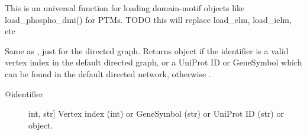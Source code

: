 \documentclass[letterpaper,10pt,english]{sphinxmanual}
\begin{document}
\begin{fulllineitems}

\begin{fulllineitems}
\label{\detokenize{main:pypath.main.PyPath.phosphopoint_directions}}
\end{fulllineitems}


\begin{fulllineitems}
\label{\detokenize{main:pypath.main.PyPath.phosphosite_directions}}
\end{fulllineitems}


\begin{fulllineitems}
\label{\detokenize{main:pypath.main.PyPath.process_directions}}
\end{fulllineitems}


\begin{fulllineitems}
\label{\detokenize{main:pypath.main.PyPath.process_dmi}}
This is an universal function
for loading domain-motif objects
like load\_phospho\_dmi() for PTMs.
TODO this will replace load\_elm, load\_ielm, etc

\end{fulllineitems}


\begin{fulllineitems}
\label{\detokenize{main:pypath.main.PyPath.protein}}
Same as , just for the directed graph.
Returns  object if the identifier
is a valid vertex index in the default directed graph,
or a UniProt ID or GeneSymbol which can be found in the
default directed network, otherwise .
\begin{description}
\item[{@identifier}] \leavevmode{[}int, str{]}
Vertex index (int) or GeneSymbol (str) or UniProt ID (str) or
 object.


\end{description}
\end{fulllineitems}
\end{fulllineitems}
\end{document}
